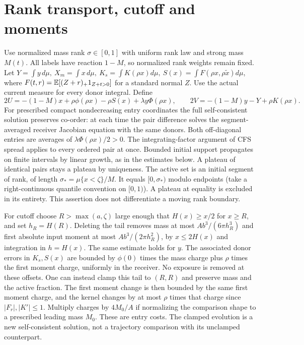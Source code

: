 \documentclass[11pt]{article}
\begin{document}
\section{Rank transport, cutoff and moments}\label{an04rpsv1:rank}
Use normalized mass rank \(\sigma\in[0,1]\) with uniform rank law and
strong mass \(M(t)\). All labels have reaction \(1-M\), so normalized
rank weights remain fixed. Let \(Y=\int y\,d\mu,\ X_m=\int x\,d\mu,\
K_s=\int K(\rho x)d\mu,\ S(x)=\int F(\rho x,\rho\widetilde x)d\mu\),
where \(F(t,r)=\mathbb E[(Z+r)_+1_{Z+t>0}]\) for a standard normal \(Z\).
Use the actual current measure for every donor integral. Define
\[
 2U=-(1-M)x+\rho\phi(\rho x)-\rho S(x)+\lambda y\Phi(\rho x),
 \qquad 2V=-(1-M)y-Y+\rho K(\rho x).
\]
For prescribed compact nondecreasing entry coordinates the full
self-consistent solution preserves co-order: at each time the pair
difference solves the segment-averaged receiver Jacobian equation
with the same donors. Both off-diagonal entries are averages of
\(\lambda\Phi(\rho x)/2>0\). The integrating-factor argument of CFS
spread applies to every ordered pair at once. Bounded initial support
propagates on finite intervals by linear growth, as in the estimates
below. A plateau of identical pairs stays a plateau by uniqueness.
The active set is an initial segment of rank, of length
\(\sigma_*=\mu\{x<\zeta\}/M\). It equals \([0,\sigma_*)\) modulo
endpoints (take a right-continuous quantile convention on \([0,1)\)).
A plateau at equality is excluded in its entirety. This assertion
does not differentiate a moving rank boundary.

For cutoff choose \(R>\max(a,\zeta)\) large enough that
\(H(x)\ge x/2\) for \(x\ge R\), and set \(h_R=H(R)\).
Deleting the tail removes mass at most
\(Ab^3/(6\pi h_R^3)\) and first absolute input moment at most
\(Ab^3/(2\pi h_R^2)\), by \(x\le2H(x)\) and integration in
\(h=H(x)\). The same estimate holds for \(y\). The associated donor
errors in \(K_s,S(x)\) are bounded by \(\phi(0)\) times the mass
charge plus \(\rho\) times the first moment charge, uniformly in the
receiver. No exposure is removed at these offsets. One can instead
clamp this tail to \((R,R)\) and preserve mass and the active fraction.
The first moment change is then bounded by the same first moment charge,
and the kernel changes by at most \(\rho\) times that charge since
\(|F_r|,|K'|\le1\). Multiply charges by \(4M_0/A\) if normalizing
the comparison shape to a prescribed leading mass \(M_0\).
These are entry costs. The clamped evolution is a new self-consistent
solution, not a trajectory comparison with its unclamped counterpart.
\end{document}
